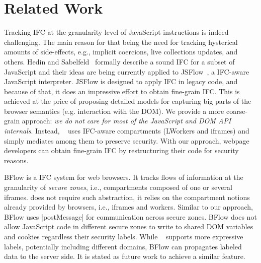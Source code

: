 \section{Related Work}
\label{sec:related}


Tracking IFC at the granularity level of JavaScript instructions is indeed
challenging. The main reason for that being the need for tracking hysterical
amounts of side-effects, e.g., implicit coercions, live collections updates, and
others. Hedin and Sabelfeld~\cite{Hedin:2012} formally describe a sound IFC for
a subset of JavaScript and their ideas are being currently applied to
JSFlow~, a IFC-aware
JavaScript interpreter.  JSFlow is designed to apply IFC in legacy code, and
because of that, it does an impressive effort to obtain fine-grain IFC. This is
achieved at the price of proposing detailed models for capturing big parts of
the browser semantics (e.g. interaction with the DOM). We provide a more
coarse-grain approach: \emph{we do not care for most of the JavaScript and DOM
  API internals}. Instead, \sys~ uses IFC-aware compartments (LWorkers and
iframes) and simply mediates among them to preserve security. With our approach,
webpage developers can obtain fine-grain IFC by restructuring their code
for security reasons.

BFlow is a IFC system for web browsers. It tracks flows of information at the
granularity of \emph{secure zones}, i.e., compartments composed of one or
several iframes.  {\sys} does not require such abstraction, it relies on the
compartment notions already provided by browsers, i.e., iframes and
workers. Similar to our approach, BFlow uses \js|postMessage| for communication
across secure zones. BFlow does not allow JavaScript code in different secure
zones to write to shared DOM variables and cookies regardless their 
security labels.  While \sys~ supports more expressive labels, potentially
including different domains, BFlow can propagates labeled data to the server
side. It is stated as future work to achieve a similar feature.

